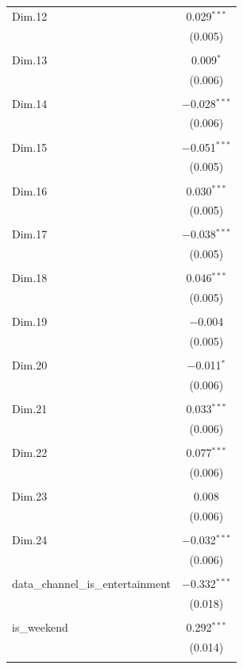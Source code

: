 \begin{table}[h]
\begin{tabular}{@{\extracolsep{5pt}}lc}
 Dim.12 & 0.029$^{***}$ \\ 
  & (0.005) \\ 
  & \\ 
 Dim.13 & 0.009$^{*}$ \\ 
  & (0.006) \\ 
  & \\ 
 Dim.14 & $-$0.028$^{***}$ \\ 
  & (0.006) \\ 
  & \\ 
 Dim.15 & $-$0.051$^{***}$ \\ 
  & (0.005) \\ 
  & \\ 
 Dim.16 & 0.030$^{***}$ \\ 
  & (0.005) \\ 
  & \\ 
 Dim.17 & $-$0.038$^{***}$ \\ 
  & (0.005) \\ 
  & \\ 
 Dim.18 & 0.046$^{***}$ \\ 
  & (0.005) \\ 
  & \\ 
 Dim.19 & $-$0.004 \\ 
  & (0.005) \\ 
  & \\ 
 Dim.20 & $-$0.011$^{*}$ \\ 
  & (0.006) \\ 
  & \\ 
 Dim.21 & 0.033$^{***}$ \\ 
  & (0.006) \\ 
  & \\ 
 Dim.22 & 0.077$^{***}$ \\ 
  & (0.006) \\ 
  & \\ 
 Dim.23 & 0.008 \\ 
  & (0.006) \\ 
  & \\ 
 Dim.24 & $-$0.032$^{***}$ \\ 
  & (0.006) \\ 
  & \\ 
 data\_channel\_is\_entertainment & $-$0.332$^{***}$ \\ 
  & (0.018) \\ 
  & \\ 
 is\_weekend & 0.292$^{***}$ \\ 
  & (0.014) \\ 
  & \\ 

\end{tabular}
\end{table}

